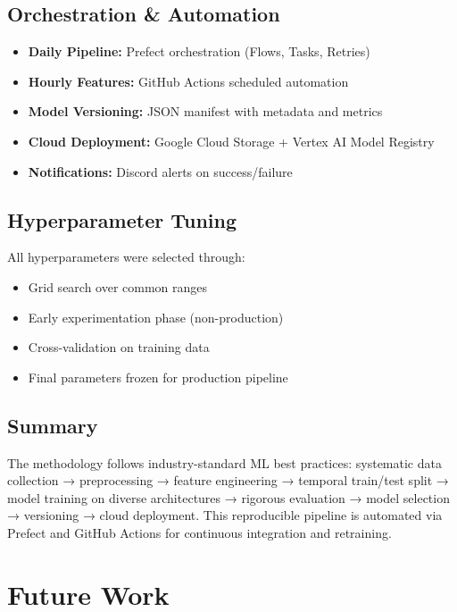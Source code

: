 \subsection{Orchestration \& Automation}

\begin{itemize}
    \item \textbf{Daily Pipeline:} Prefect orchestration (Flows, Tasks, Retries)
    \item \textbf{Hourly Features:} GitHub Actions scheduled automation
    \item \textbf{Model Versioning:} JSON manifest with metadata and metrics
    \item \textbf{Cloud Deployment:} Google Cloud Storage + Vertex AI Model Registry
    \item \textbf{Notifications:} Discord alerts on success/failure
\end{itemize}

\subsection{Hyperparameter Tuning}

All hyperparameters were selected through:
\begin{itemize}
    \item Grid search over common ranges
    \item Early experimentation phase (non-production)
    \item Cross-validation on training data
    \item Final parameters frozen for production pipeline
\end{itemize}

\subsection{Summary}

The methodology follows industry-standard ML best practices: systematic data collection → preprocessing → feature engineering → temporal train/test split → model training on diverse architectures → rigorous evaluation → model selection → versioning → cloud deployment. This reproducible pipeline is automated via Prefect and GitHub Actions for continuous integration and retraining.

\section{Future Work}

